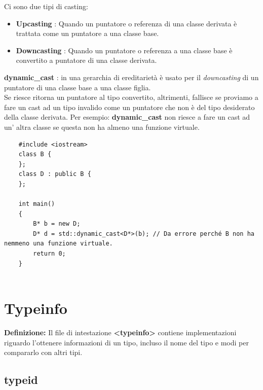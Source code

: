 \textsf{\small Ci sono due tipi di casting: } \\

\begin{itemize}
	\item \textsf{\small \textbf{Upcasting} : Quando un puntatore o referenza di una classe derivata è trattata come un puntatore a una classe base.}
	\item \textsf{\small \textbf{Downcasting} : Quando un puntatore o referenza a una classe base è convertito a puntatore di una classe derivata.}
\end{itemize}

\textsf{\small \textbf{dynamic\_cast} : in una gerarchia di ereditarietà è usato per il \emph{downcasting} di un puntatore di una classe base a una classe figlia.} \\

\textsf{\small Se riesce ritorna un puntatore al tipo convertito, altrimenti, fallisce se proviamo a fare un cast ad un tipo invalido come un puntatore che non è del tipo desiderato della classe derivata. Per esempio: \textbf{dynamic\_cast} non riesce a fare un cast ad un' altra classe se questa non ha almeno una funzione virtuale.} \\

\begin{lstlisting}
	#include <iostream>
	class B {
	};
	class D : public B {
	};
	
	int main()
	{
		B* b = new D;
		D* d = std::dynamic_cast<D*>(b); // Da errore perché B non ha nemmeno una funzione virtuale.
		return 0;
	}
	
\end{lstlisting}


\section{Typeinfo}

\textsf{\small \textbf{Definizione: } Il file di intestazione \textbf{<typeinfo>} contiene implementazioni riguardo l'ottenere informazioni di un tipo, incluso il nome del tipo e modi per compararlo con altri tipi.} \\

\subsection{typeid}

